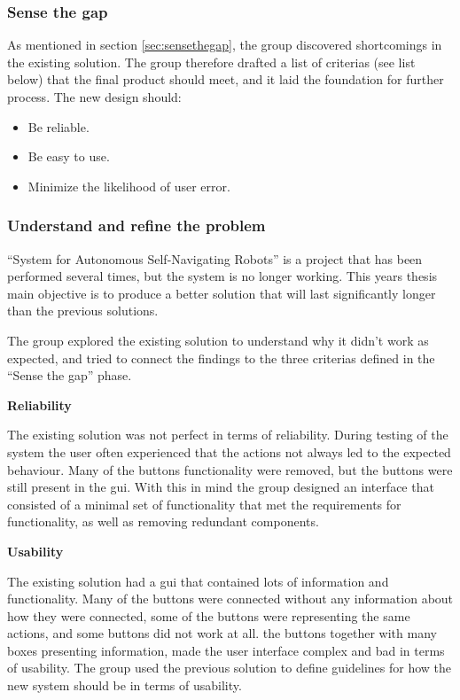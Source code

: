 \subsubsection{Sense the gap}
As mentioned in section \ref{sec:sensethegap}, the group discovered shortcomings in the existing solution. The group therefore drafted a list of criterias (see list below) that the final product should meet, and it laid the foundation for further process. The new design should:

\begin{itemize}
    \item Be reliable.
    \item Be easy to use.
    \item Minimize the likelihood of user error.
\end{itemize}


\subsubsection{Understand and refine the problem}
``System for Autonomous Self-Navigating Robots'' is a project that has been performed several times, but the system is no longer working. This years thesis main objective is to produce a better solution that will last significantly longer than the previous solutions.

The group explored the existing solution to understand why it didn't work as expected, and tried to connect the findings to the three criterias defined in the ``Sense the gap'' phase.

\textbf{Reliability}

The existing solution was not perfect in terms of reliability. During testing of the system the user often experienced that the actions not always led to the expected behaviour. Many of the buttons functionality were removed, but the buttons were still present in the \acrshort{gui}. With this in mind the group designed an interface that consisted of a minimal set of functionality that met the requirements for functionality, as well as removing redundant components.

\textbf{Usability}

The existing solution had a \acrshort{gui} that contained lots of information and functionality. Many of the buttons were connected without any information about how they were connected, some of the buttons were representing the same actions, and some buttons did not work at all. the buttons together with many boxes presenting information, made the user interface complex and bad in terms of usability. The group used the previous solution to define guidelines for how the new system should be in terms of usability.

